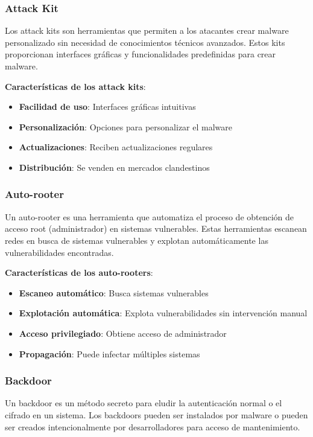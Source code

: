 \subsubsection{Attack Kit}

Los attack kits son herramientas que permiten a los atacantes crear malware personalizado sin necesidad de conocimientos técnicos avanzados. Estos kits proporcionan interfaces gráficas y funcionalidades predefinidas para crear malware.

\textbf{Características de los attack kits}:
\begin{itemize}
    \item \textbf{Facilidad de uso}: Interfaces gráficas intuitivas
    \item \textbf{Personalización}: Opciones para personalizar el malware
    \item \textbf{Actualizaciones}: Reciben actualizaciones regulares
    \item \textbf{Distribución}: Se venden en mercados clandestinos
\end{itemize}

\subsubsection{Auto-rooter}

Un auto-rooter es una herramienta que automatiza el proceso de obtención de acceso root (administrador) en sistemas vulnerables. Estas herramientas escanean redes en busca de sistemas vulnerables y explotan automáticamente las vulnerabilidades encontradas.

\textbf{Características de los auto-rooters}:
\begin{itemize}
    \item \textbf{Escaneo automático}: Busca sistemas vulnerables
    \item \textbf{Explotación automática}: Explota vulnerabilidades sin intervención manual
    \item \textbf{Acceso privilegiado}: Obtiene acceso de administrador
    \item \textbf{Propagación}: Puede infectar múltiples sistemas
\end{itemize}

\subsubsection{Backdoor}

Un backdoor es un método secreto para eludir la autenticación normal o el cifrado en un sistema. Los backdoors pueden ser instalados por malware o pueden ser creados intencionalmente por desarrolladores para acceso de mantenimiento.

